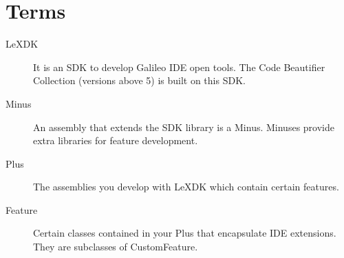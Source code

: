 
\chapter{Terms}
\newpage
\begin{description}
\item [LeXDK] It is an SDK to develop Galileo IDE open tools. The Code
Beautifier Collection (versions above 5) is built on this SDK.

\item [Minus] An assembly that extends the SDK library is a Minus. Minuses
provide extra libraries for feature development.

\item [Plus] The assemblies you develop with LeXDK which contain certain 
features. 

\item [Feature] Certain classes contained in your Plus that encapsulate IDE
extensions. They are subclasses of CustomFeature.

\end{description}
